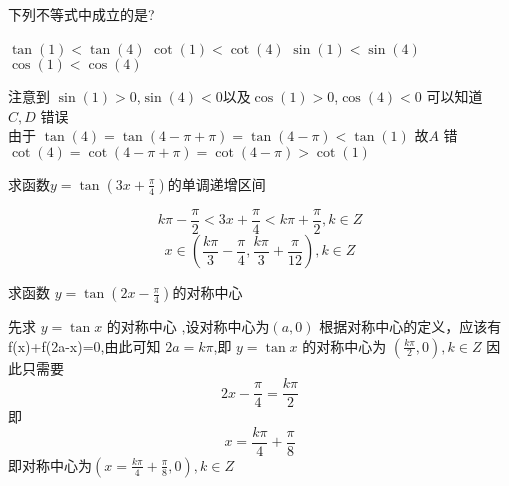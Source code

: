 \documentclass[12pt,answers]{exam}
\begin{document}
{}
\begin{questions}
\question 
{}
\question 下列不等式中成立的是? \fillin[B]
\\
\begin{oneparchoices}
\choice $\tan(1) < \tan(4)$ 
\CorrectChoice $\cot(1) < \cot(4)$
\choice $\sin(1) < \sin(4)$
\choice $\cos(1) < \cos(4)$
\end{oneparchoices}
\begin{solution}
注意到 $\sin{(1)}>0$,$\sin{(4)}<0$以及$\cos{(1)}>0$,$\cos{(4)}<0$ 可以知道 $C,D$ 错误\\
由于 $\tan{(4)}=\tan{(4-\pi+\pi)}=\tan{(4-\pi)}<\tan{(1)}$ 故$A$ 错 \\
$\cot{(4)}=\cot{(4-\pi+\pi)}=\cot(4-\pi)>\cot{(1)}$ 

\end{solution}

\question 求函数$y=\tan(3x+\frac{\pi}{4})$的单调递增区间
\begin{solution}
\[k\pi-\frac{\pi}{2}< 3x+\frac{\pi}{4}< k\pi+\frac{\pi}{2},k\in Z\]
\[ x\in (\frac{k\pi}{3}-\frac{\pi}{4},\frac{k\pi}{3}+\frac{\pi}{12} ),k \in Z\]
\end{solution}

\question 求函数 $y=\tan(2x-\frac{\pi}{4})$的对称中心
\begin{solution}
先求 $y=\tan{x}$ 的对称中心 ,设对称中心为$(a,0)$
根据对称中心的定义，应该有 f(x)+f(2a-x)=0,由此可知 $2a=k\pi$,即
$y=\tan{x}$ 的对称中心为 $(\frac{k\pi}{2},0),k\in Z$
因此只需要
\[2x-\frac{\pi}{4} =\frac{k\pi}{2}\]
即 \[x=\frac{k\pi}{4} +\frac{\pi}{8}\]
即对称中心为$(x=\frac{k\pi}{4} +\frac{\pi}{8},0),k\in Z$
\end{solution}


\end{questions}
\end{document}
